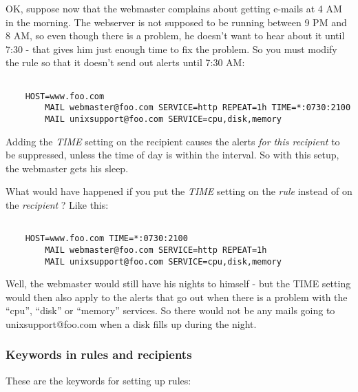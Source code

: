  OK, suppose now that the webmaster complains about getting e-mails at 4 AM in the morning. The webserver is not supposed to be running between 9 PM and 8 AM, so even though there is a problem, he doesn't want to hear about it until 7:30 - that gives him just enough time to fix the problem. So you must modify the rule so that it doesn't send out alerts until 7:30 AM:
\begin{verbatim}

	HOST=www.foo.com
		MAIL webmaster@foo.com SERVICE=http REPEAT=1h TIME=*:0730:2100
		MAIL unixsupport@foo.com SERVICE=cpu,disk,memory

\end{verbatim}


 Adding the \emph{TIME}
 setting on the recipient causes the alerts \emph{for this recipient}
 to be suppressed, unless the time of day is within the interval. So with this setup, the webmaster gets his sleep.


 What would have happened if you put the \emph{TIME}
 setting on the \emph{rule}
 instead of on the \emph{recipient}
 ? Like this: \begin{verbatim}

	HOST=www.foo.com TIME=*:0730:2100
		MAIL webmaster@foo.com SERVICE=http REPEAT=1h
		MAIL unixsupport@foo.com SERVICE=cpu,disk,memory

\end{verbatim}



 Well, the webmaster would still have his nights to himself - but the TIME setting would then also apply to the alerts that go out when there is a problem with the ``cpu'', ``disk'' or ``memory'' services. So there would not be any mails going to unixsupport@foo.com when a disk fills up during the night.
\subsubsection{Keywords in rules and recipients}


 These are the keywords for setting up rules:


